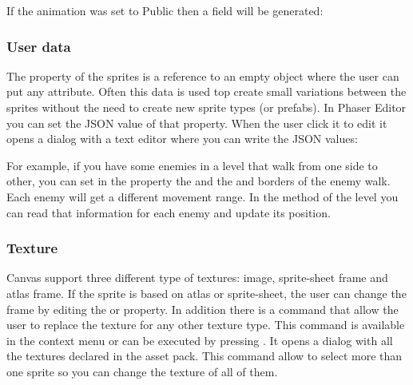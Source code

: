 \documentclass[letterpaper,10pt,english]{sphinxmanual}
\begin{document}
If the animation  was set to Public then a field  will be generated:

\begin{sphinxVerbatim}[commandchars=\\\{\}]
    \PYG{p}{[}\PYG{p}{]}  
 \PYG{p}{[}\PYG{p}{]}  


  
\end{sphinxVerbatim}


\subsubsection{User data}
\label{\detokenize{canvas:user-data}}
The  property of the sprites is a reference to an empty object where the user can put any attribute. Often this data is used top create small variations between the sprites without the need to create new sprite types (or prefabs). In Phaser Editor you can set the JSON value of that property. When the user click it to edit it opens a dialog with a text editor where you can write the JSON values:

\noindent{}

For example, if you have some enemies in a level that walk from one side to other, you can set in the  property the  and the  and  borders of the enemy walk. Each enemy will get a different movement range. In the  method of the level you can read that information for each enemy and update its position.


\subsubsection{Texture}
\label{\detokenize{canvas:texture}}
Canvas support three different type of textures: image, sprite-sheet frame and atlas frame. If the sprite is based on atlas or sprite-sheet, the user can change the frame by editing the  or  property. In addition there is a  command that allow the user to replace the texture for any other texture type. This command is available in the context menu  or can be executed by pressing . It opens a dialog with all the textures declared in the asset pack. This command allow to select more than one sprite so you can change the texture of all of them.
\end{document}
